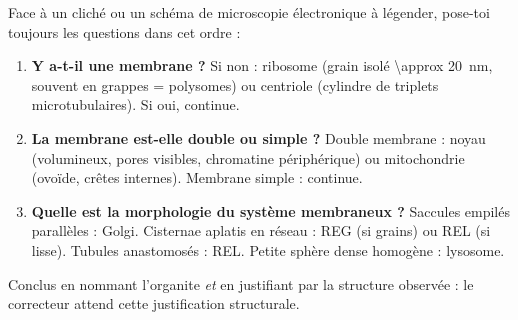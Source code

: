 \documentclass[11pt]{article}
\begin{document}
\begin{methode}
Face à un cliché ou un schéma de microscopie électronique à légender, pose-toi toujours les questions dans cet ordre :
\begin{enumerate}
\item \textbf{Y a-t-il une membrane ?} Si non : ribosome (grain isolé \SI{\approx 20}{\nano\meter}, souvent en grappes = polysomes) ou centriole (cylindre de triplets microtubulaires). Si oui, continue.
\item \textbf{La membrane est-elle double ou simple ?} Double membrane : noyau (volumineux, pores visibles, chromatine périphérique) ou mitochondrie (ovoïde, crêtes internes). Membrane simple : continue.
\item \textbf{Quelle est la morphologie du système membraneux ?} Saccules empilés parallèles : Golgi. Cisternae aplatis en réseau : REG (si grains) ou REL (si lisse). Tubules anastomosés : REL. Petite sphère dense homogène : lysosome.
\end{enumerate}
Conclus en nommant l'organite \emph{et} en justifiant par la structure observée : le correcteur attend cette justification structurale.
\end{methode}
\end{document}

